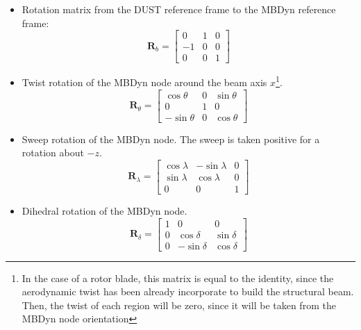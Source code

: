 \begin{itemize}
    \item Rotation matrix from the DUST reference frame to the MBDyn reference frame:
    \begin{equation}
        \mathbf{R}_{b} = 
        \begin{bmatrix}
            0 & 1 & 0\\
            -1 & 0 & 0\\
            0 & 0 & 1
        \end{bmatrix}
        \label{eq:rotbeam}
    \end{equation}

    \item Twist rotation of the MBDyn node around the beam axis $x$\footnote[1]{In the case of a rotor blade, this matrix is equal to the identity, since the aerodynamic twist has been already incorporate to build the structural beam. Then, the twist of each region will be zero, since it will be taken from the MBDyn node orientation}. 
    \begin{equation}
        \mathbf{R}_{\theta} = 
        \begin{bmatrix}
            \cos \theta & 0 & \sin\theta\\ 
            0 & 1 & 0\\ 
            -\sin\theta & 0 & \cos\theta
        \end{bmatrix}
        \label{eq:rottwist}
    \end{equation}
    
    \item Sweep rotation of the MBDyn node. The sweep is taken positive for a rotation about $-z$. 
    \begin{equation}
        \mathbf{R}_{\lambda} = 
        \begin{bmatrix}
            \cos\lambda & -\sin\lambda & 0\\ 
            \sin\lambda & \cos\lambda & 0\\ 
            0 & 0 & 1 
        \end{bmatrix}
        \label{eq:rotsweep}
    \end{equation}
    
    \item Dihedral rotation of the MBDyn node. 
    \begin{equation}
        \mathbf{R}_{\delta} = 
        \begin{bmatrix}
            1 & 0 & 0\\ 
            0 & \cos\delta & \sin\delta\\ 
            0 & -\sin\delta & \cos\delta 
        \end{bmatrix}
        \label{eq:rotdih}
    \end{equation}
\end{itemize}

